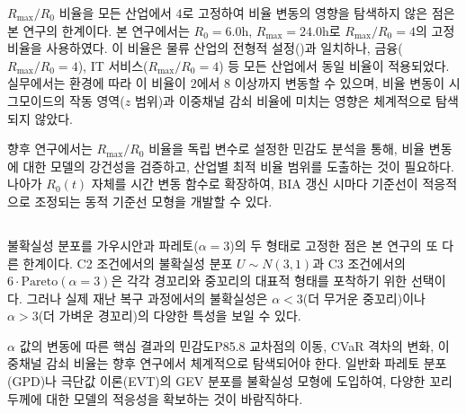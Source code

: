 $R_{\max}/R_0$ 비율을 모든 산업에서 4로 고정하여 비율 변동의 영향을 탐색하지
않은 점은 본 연구의 한계이다. 본 연구에서는 $R_0 = 6.0$h, $R_{\max} = 24.0$h로 $R_{\max}/R_0 = 4$의
고정 비율을 사용하였다. 이 비율은 물류 산업의 전형적 설정()과
일치하나, 금융($R_{\max}/R_0 = 4$), IT 서비스($R_{\max}/R_0 = 4$) 등
모든 산업에서 동일 비율이 적용되었다. 실무에서는  환경에 따라
이 비율이 $2$에서 $8$ 이상까지 변동할 수 있으며, 비율 변동이 시그모이드의
작동 영역($z$ 범위)과 이중채널 감쇠 비율에 미치는 영향은
체계적으로 탐색되지 않았다.

향후 연구에서는 $R_{\max}/R_0$ 비율을 독립 변수로 설정한 민감도 분석을 통해,
비율 변동에 대한 모델의 강건성을 검증하고, 산업별 최적 비율 범위를
도출하는 것이 필요하다. 나아가 $R_0(t)$ 자체를 시간 변동 함수로 확장하여,
BIA 갱신 시마다 기준선이 적응적으로 조정되는 동적 기준선 모형을 개발할 수 있다.


\subsection{}
\label{subsec:lim-distribution}

불확실성 분포를 가우시안과 파레토($\alpha = 3$)의 두 형태로 고정한 점은 본 연구의
또 다른 한계이다. C2 조건에서의 불확실성 분포 $U \sim N(3,1)$과 C3 조건에서의
$6 \cdot \mathrm{Pareto}(\alpha = 3)$은 각각 경꼬리와 중꼬리의
대표적 형태를 포착하기 위한 선택이다. 그러나 실제 재난 복구 과정에서의
불확실성은 $\alpha < 3$(더 무거운 중꼬리)이나 $\alpha > 3$(더 가벼운 경꼬리)의
다양한 특성을 보일 수 있다.

$\alpha$ 값의 변동에 따른 핵심 결과의 민감도\chg{(}P85.8 교차점의 이동,
CVaR 격차의 변화, 이중채널 감쇠 비율\chg{)}는 향후 연구에서 체계적으로 탐색되어야 한다.
일반화 파레토 분포(GPD)나 극단값 이론(EVT)의 GEV 분포를
불확실성 모형에 도입하여, 다양한 꼬리 두께에 대한 모델의 적응성을
확보하는 것이 바람직하다.



